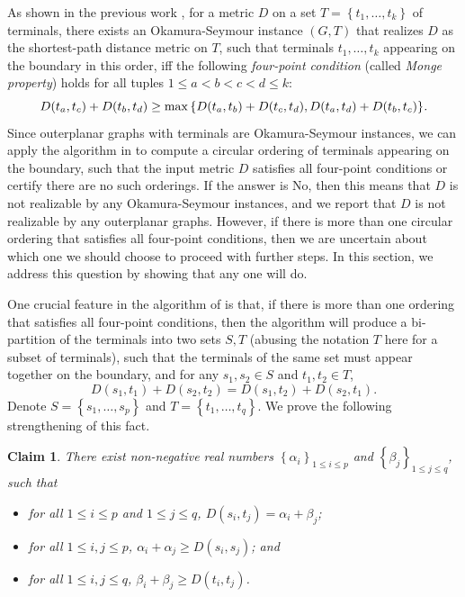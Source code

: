 \documentclass[11pt]{article}
\newtheorem{claim}[theorem]{Claim}
\newcommand{\set}[1]{\left\{ #1 \right\}}
\begin{document}
As shown in the previous work \cite{ChangO20,hurkens1988tidy}, for a metric $D$ on a set $T=\set{t_1,\ldots,t_k}$ of terminals, there exists an Okamura-Seymour instance $(G,T)$ that realizes $D$ as the shortest-path distance metric on $T$, such that terminals $t_1,\ldots,t_k$ appearing on the boundary in this order, iff the following \emph{four-point condition} (called \emph{Monge property}) holds for all tuples $1\le a<b<c<d\le k$:
\[
\emph{$D(t_a,t_c)+D(t_b,t_d)\ge \max\set{D(t_a,t_b)+D(t_c,t_d), D(t_a,t_d)+D(t_b,t_c)}$.}
\]
Since outerplanar graphs with terminals are Okamura-Seymour instances, we can apply the algorithm in \cite{chen2025path} to compute a circular ordering of terminals appearing on the boundary, such that the input metric $D$ satisfies all four-point conditions or certify there are no such orderings. If the answer is \textsf{No}, then this means that $D$ is not realizable by any Okamura-Seymour instances, and we report that $D$ is not realizable by any outerplanar graphs.
However, if there is more than one circular ordering that satisfies all four-point conditions, then we are uncertain about which one we should choose to proceed with further steps.
In this section, we address this question by showing that any one will do.

One crucial feature in the algorithm of \cite{chen2025path} is that, if there is more than one ordering that satisfies all four-point conditions, then the algorithm will produce a bi-partition of the terminals into two sets $S,T$ (abusing the notation $T$ here for a subset of terminals), such that the terminals of the same set must appear together on the boundary, and for any $s_1,s_2 \in S$ and $t_1,t_2 \in T$, 
\[
D(s_1,t_1)+D(s_2,t_2)=D(s_1,t_2)+D(s_2,t_1).
\]
Denote $S=\set{s_1,\ldots,s_p}$ and  $T=\set{t_1,\ldots,t_q}$. We prove the following strengthening of this fact.


\begin{claim} \label{block-exist}
There exist non-negative real numbers $\set{\alpha_i}_{1\le i\le p}$ and $\set{\beta_j}_{1\le j\le q}$, such that
    \begin{itemize}
        \item for all $1\le i\le p$ and $1\le j\le q$, $D(s_i,t_j)=\alpha_i + \beta_j$;
        \item for all $1\le i,j\le p$, $\alpha_i+\alpha_j \ge D (s_i,s_j)$; and
        \item for all $1\le i,j \le q$, $\beta_i+\beta_j \ge D(t_i,t_j)$.
    \end{itemize}
\end{claim}
\end{document}
